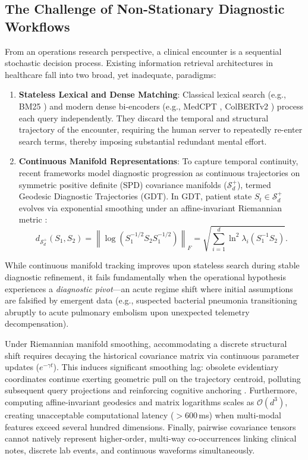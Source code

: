 \documentclass[ijds,dblanonrev]{informs4}
\newcommand{\norm}[1]{\left\lVert#1\right\rVert}
\begin{document}
\subsection{The Challenge of Non-Stationary Diagnostic Workflows}
From an operations research perspective, a clinical encounter is a sequential stochastic decision process. Existing information retrieval architectures in healthcare fall into two broad, yet inadequate, paradigms:
\begin{enumerate}[(1)]
  \item \textbf{Stateless Lexical and Dense Matching}: Classical lexical search (e.g., BM25 \citep{baeza1999modern}) and modern dense bi-encoders (e.g., MedCPT \citep{jin2023medcpt}, ColBERTv2 \citep{santhanam2022colbertv2}) process each query independently. They discard the temporal and structural trajectory of the encounter, requiring the human server to repeatedly re-enter search terms, thereby imposing substantial redundant mental effort.
  \item \textbf{Continuous Manifold Representations}: To capture temporal continuity, recent frameworks model diagnostic progression as continuous trajectories on symmetric positive definite (SPD) covariance manifolds ($\mathcal{S}_d^+$), termed Geodesic Diagnostic Trajectories (GDT). In GDT, patient state $S_t \in \mathcal{S}_d^+$ evolves via exponential smoothing under an affine-invariant Riemannian metric \citep{pennec2006riemannian}:
  \begin{equation}
    d_{\mathcal{S}_d^+}(S_1, S_2) = \norm{\log(S_1^{-1/2} S_2 S_1^{-1/2})}_F = \sqrt{\sum_{i=1}^d \ln^2 \lambda_i(S_1^{-1} S_2)}.
    \label{eq:geodesic_dist}
  \end{equation}
\end{enumerate}

While continuous manifold tracking improves upon stateless search during stable diagnostic refinement, it fails fundamentally when the operational hypothesis experiences a \emph{diagnostic pivot}---an acute regime shift where initial assumptions are falsified by emergent data (e.g., suspected bacterial pneumonia transitioning abruptly to acute pulmonary embolism upon unexpected telemetry decompensation).

Under Riemannian manifold smoothing, accommodating a discrete structural shift requires decaying the historical covariance matrix via continuous parameter updates ($e^{-\gamma t}$). This induces significant smoothing lag: obsolete evidentiary coordinates continue exerting geometric pull on the trajectory centroid, polluting subsequent query projections and reinforcing cognitive anchoring \citep{croskerry2002achieving}. Furthermore, computing affine-invariant geodesics and matrix logarithms scales as $\mathcal{O}(d^3)$, creating unacceptable computational latency ($>600$\,ms) when multi-modal features exceed several hundred dimensions. Finally, pairwise covariance tensors cannot natively represent higher-order, multi-way co-occurrences linking clinical notes, discrete lab events, and continuous waveforms simultaneously.
\end{document}
